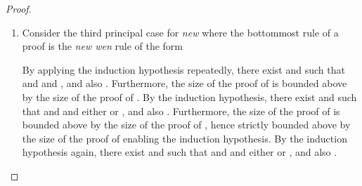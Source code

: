 \begin{proof}
\begin{enumerate}[label=\textbf{\Alph*},ref=\Alph*,leftmargin=*]
\begin{enumerate}[label*=\textbf{.\arabic*}]
\begin{comment}
such that  and .

By induction, there exist  and  such that  and , for , and -ary killing context such that 
.
Furthermore, the size of the proofs of  and  are bounded above by the size of the proof of .
Observe that by -conversion,  and  also hold, where  and .

By induction, there exist  and  such that  and  and either  or , for , and -ary killing context  such that 
.
Also by induction, there exist  and  such that  and  and either  or , for , and -ary killing context  such that 
.

Now define  and  such that

and, if  and  for all  and , then ;
otherwise . 
In cases where for some , , by Lemma~\ref{lemma:commute} ;
In cases where for some , , by Lemma~\ref{lemma:commute} .
Hence for each , one of the of the following derivations holds.
\begin{itemize}
\item 
 and  for all  and  hence
.

\item
If  for all , hence  for all , and hence  thereby , hence by using the \textit{left wen} rule
.

\item
If  for all , hence  for all , thereby , hence by using the \textit{right wen} rule
.

\item
Otherwise by using the \textit{suspend} rule the following derivation holds.

\end{itemize}
Thereby the following derivation can be constructed.

Furthermore, the following proof can be constructed.

By Lemma~\ref{lemma:bound} and since the \textit{new count} strictly decreases,
; thereby  as required.
\end{comment}
\smallskip

\item Consider the third principal  case for \textit{new} where the bottommost rule of a proof is the \textit{new wen} rule of the form

By applying the induction hypothesis repeatedly, 
there exist  and  such that 
and  and , and also . Furthermore, the size of the proof of  is bounded above by the size of the proof of .
By the induction hypothesis, there exist  and  such that  and  and either  or , and also 
.
Furthermore, the size of the proof of  is bounded above by the size of the proof of , hence strictly bounded above by the size of the proof of  enabling the induction hypothesis.
By the induction hypothesis again, there exist  and  such that  and  and either  or , and also
.


\end{enumerate}
\end{enumerate}
\end{proof}
